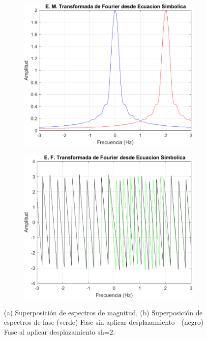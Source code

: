 \documentclass[11pt,letterpaper,twocolumn]{article}
\begin{document}
        \begin{figure}[H]
                \centering 
                \begin{subfigure}[h]{0.49\linewidth}
                    \includegraphics[width=\linewidth]{img/Propfrecmagnitud.png}
                    \label{P4}
                    \caption{}
                \end{subfigure}
                \begin{subfigure}[h]{0.49\linewidth}
                    \includegraphics[width=\linewidth]{img/Propfrecfase.png}
                    \label{P44}
                    \caption{}
                \end{subfigure}
                \caption{(a) Superposición de espectros de magnitud, (b) Superposición de espectros de fase (verde) Fase sin aplicar desplazamiento - (negro) Fase al aplicar desplazamiento sh=2.}
                \label{P44}
            \end{figure}
            
\end{document}
